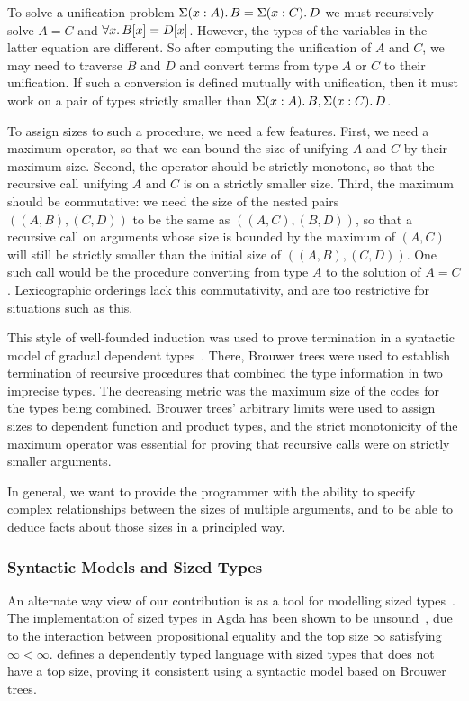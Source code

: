 To solve a unification problem $ \Sigma(x : A)\ldotp B = \Sigma(x : C)\ldotp D$
we must recursively
solve $A = C$ and $\forall x \ldotp B[x] = D[x]$.
However, the types of the variables in the latter equation are different.
So after computing the unification of $A$ and $C$, we may need to traverse
$B$ and $D$ and convert terms from type $A$ or $C$ to their unification.
If such a conversion is defined mutually with unification, then
it must work on a pair of types strictly smaller than
$\Sigma(x : A)\ldotp B , \Sigma(x : C)\ldotp D$.

To assign sizes to such a procedure, we need a few features.
First, we need
a maximum operator, so that we can bound the size of unifying $A$ and $C$
by their maximum size.
Second, the operator should be strictly monotone, so that the recursive
call unifying $A$ and $C$ is on a strictly smaller size.
Third, the maximum should be commutative:
we need the size of the nested pairs $((A,B),(C,D))$
to be the same as $((A,C),(B,D))$, so that a recursive call on arguments whose
size is bounded by the maximum of  $(A,C)$ will still
be strictly smaller than the initial size of $((A,B),(C,D))$.
One such call would be the procedure converting from type $A$ to the
solution of $A=C$.
Lexicographic orderings lack this commutativity, and are too restrictive
for situations such as this.

This style of well-founded induction was used to prove termination
in a syntactic model of gradual dependent types~\citep{Eremondi_2023}. There, Brouwer trees
were used to establish termination of recursive procedures that
combined the type information in two imprecise types.
The decreasing metric was the maximum size of the codes for the types being combined. Brouwer trees' arbitrary limits were used to assign sizes
to dependent function and product types, and the strict monotonicity of the
maximum operator was essential for proving that recursive calls were on
strictly smaller arguments.

In general, we want to provide the programmer with the ability
to specify complex relationships between the sizes of multiple arguments,
and to be able to deduce facts about those sizes in a principled way.

\subsubsection{Syntactic Models and Sized Types}

An alternate way view of our contribution is as a tool for modelling sized types~\citep{10.1145/237721.240882}.
The implementation of sized types in Agda has been shown to be unsound~\citep{agdaSizedIssue}, due to the interaction
between propositional equality and the top size $\infty$ satisfying $\infty < \infty$.
 defines a dependently typed language with sized types that does not have a top size, proving it consistent
using a syntactic model based on Brouwer trees.

